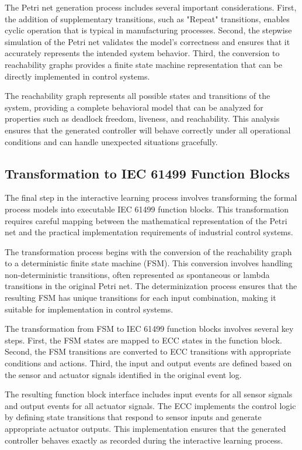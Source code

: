 The Petri net generation process includes several important considerations. First, the addition of supplementary transitions, such as "Repeat" transitions, enables cyclic operation that is typical in manufacturing processes. Second, the stepwise simulation of the Petri net validates the model's correctness and ensures that it accurately represents the intended system behavior. Third, the conversion to reachability graphs provides a finite state machine representation that can be directly implemented in control systems.

The reachability graph represents all possible states and transitions of the system, providing a complete behavioral model that can be analyzed for properties such as deadlock freedom, liveness, and reachability. This analysis ensures that the generated controller will behave correctly under all operational conditions and can handle unexpected situations gracefully.

\subsection{Transformation to IEC 61499 Function Blocks}

The final step in the interactive learning process involves transforming the formal process models into executable IEC 61499 function blocks. This transformation requires careful mapping between the mathematical representation of the Petri net and the practical implementation requirements of industrial control systems.

The transformation process begins with the conversion of the reachability graph to a deterministic finite state machine (FSM). This conversion involves handling non-deterministic transitions, often represented as spontaneous or lambda transitions in the original Petri net. The determinization process ensures that the resulting FSM has unique transitions for each input combination, making it suitable for implementation in control systems.


The transformation from FSM to IEC 61499 function blocks involves several key steps. First, the FSM states are mapped to ECC states in the function block. Second, the FSM transitions are converted to ECC transitions with appropriate conditions and actions. Third, the input and output events are defined based on the sensor and actuator signals identified in the original event log.

The resulting function block interface includes input events for all sensor signals and output events for all actuator signals. The ECC implements the control logic by defining state transitions that respond to sensor inputs and generate appropriate actuator outputs. This implementation ensures that the generated controller behaves exactly as recorded during the interactive learning process.


